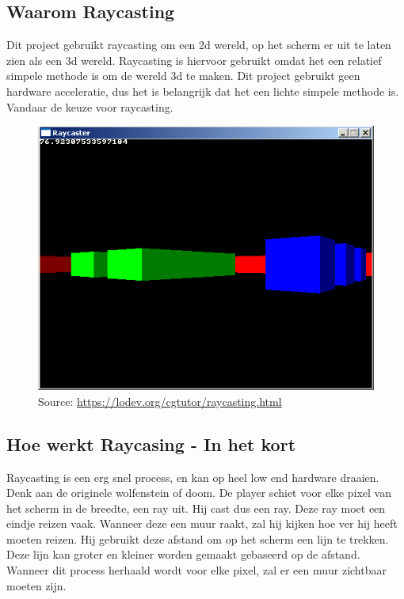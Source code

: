 \documentclass{report}
\begin{document}
    \subsection{Waarom Raycasting} %
    \label{sub:waarom_raycasting}
    Dit project gebruikt raycasting om een 2d wereld, op het scherm er uit te laten zien als een 3d wereld. Raycasting is hiervoor gebruikt omdat het een relatief simpele methode is om de wereld 3d te maken. Dit project gebruikt geen hardware acceleratie, dus het is belangrijk dat het een lichte simpele methode is. Vandaar de keuze voor raycasting.
    \begin{figure}[h]
      \includegraphics[width=\textwidth]{technisch verslag imgs/raycasteruntextured.png}
      \caption{Source: \url{https://lodev.org/cgtutor/raycasting.html}}
    \end{figure}

    \subsection{Hoe werkt Raycasing - In het kort} %
    \label{sub:hoe_werkt_raycasing_in_het_kort}
    Raycasting is een erg snel process, en kan op heel low end hardware draaien. Denk aan de originele wolfenstein of doom.
    De player schiet voor elke pixel van het scherm in de breedte, een ray uit. Hij cast dus een ray. Deze ray moet een eindje reizen vaak. Wanneer deze een muur raakt, zal hij kijken hoe ver hij heeft moeten reizen. Hij gebruikt deze afstand om op het scherm een lijn te trekken. Deze lijn kan groter en kleiner worden gemaakt gebaseerd op de afstand. Wanneer dit process herhaald wordt voor elke pixel, zal er een muur zichtbaar moeten zijn.
\end{document}
